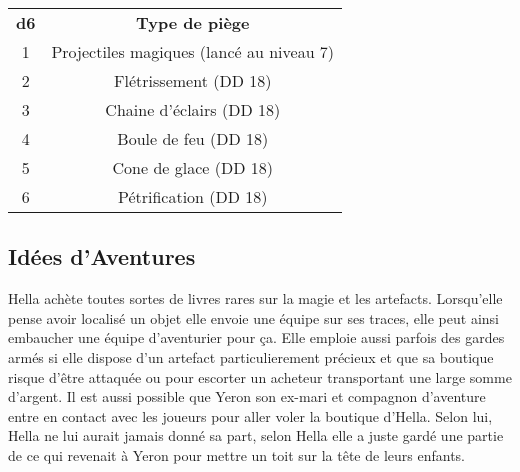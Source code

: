 \begin{table} [h]
    \setlength{\tabcolsep}{4pt}
    \center
\begin{tabular}{cc}
  \bf d6 & \bf Type de piège \\
   \rowcolor{LightCyan}
  1 & Projectiles magiques (lancé au niveau 7) \\
  2 & Flétrissement (DD 18)\\
   \rowcolor{LightCyan}
  3 & Chaine d'éclairs (DD 18)\\
  4 & Boule de feu  (DD 18)\\
   \rowcolor{LightCyan}
  5 & Cone de glace (DD 18)\\
  6 & Pétrification (DD 18)\\
\end{tabular}
    \setlength{\tabcolsep}{6pt}
\end{table}

\subsection{Idées d'Aventures}

Hella achète toutes sortes de livres rares sur la magie et les artefacts.
Lorsqu'elle pense avoir localisé un objet elle envoie une équipe sur ses 
traces, elle peut ainsi embaucher une équipe d'aventurier pour ça. Elle 
emploie aussi parfois des gardes armés si elle dispose d'un artefact 
particulierement précieux et que sa boutique risque d'être attaquée ou pour 
escorter un acheteur transportant une large somme d'argent. 
Il est aussi possible que Yeron son ex-mari et compagnon d'aventure entre 
en contact avec les joueurs pour aller voler la boutique d'Hella. Selon lui,
Hella ne lui aurait jamais donné sa part, selon Hella elle a juste gardé une 
partie de ce qui revenait à Yeron pour mettre un toit sur la tête de leurs 
enfants.

